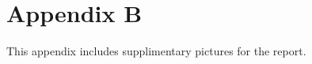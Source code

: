\section{Appendix B}
\label{appendix:b}

This appendix includes supplimentary pictures for the report.

